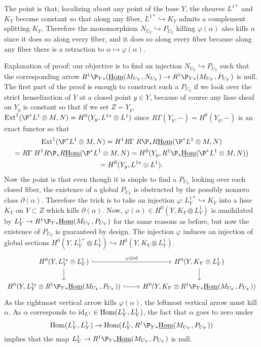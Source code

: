 \documentclass[deligne.tex]{subfiles}
\begin{document}
The point is that, localizing about any point of the base $Y$, the sheaves
$L^{1*}$ and $K_Y$ become constant so that along any fiber,
$L^{1*}\hookrightarrow K_Y$ admits a complement splitting $K_Y$.
Therefore the monomorphism $N_{U_Y}\hookrightarrow P_{U_Y}$ killing
$\varphi(\alpha)$ also kills $\alpha$ since it does so along every fiber,
and it does so along every fiber because along any fiber there is a 
retraction to $\alpha\mapsto\varphi(\alpha)$.

Explanation of proof: our objective is to find an injection
$N_{U_Y}\hookrightarrow P_{U_Y}$ such that the corresponding arrow
$R^1\P_{Y*}(\underline\Hom(M_{U_Y},N_{U_Y})\ra R^1\P_{Y*}(M_{U_Y},P_{U_Y})$
is null. The first part of the proof is enough to construct such a $P_{U_Y}$
if we look over the strict henselization of $Y$ at a closed point
$y\in Y$, because of course any lisse sheaf on $Y_y$ is constant so that if
we set $Z=Y_y$,
$\Ext^1(\P^*L^1\otimes M,N)=H^0(Y_y,L^{1*}\otimes L^1)$
since $R\Gamma(Y_y,-)=H^0(Y_y,-)$ is an exact functor so that
\begin{multline*}
	\Ext^1(\P^*L^1\otimes M,N)
	=H^1R\Gamma\; R\P_*R\underline\Hom(\P^*L^1\otimes M,N) \\
	=R\Gamma\;H^1R\P_*R\underline\Hom(\P^*L^1\otimes M,N)
	=H^0(Y_y,R^1\P_*\underline\Hom(\P^*L^1\otimes M,N)) \\
	=H^0(Y_y,L^{1*}\otimes L^1).
\end{multline*}
Now the point is that even though it is simple to find a $P_{U_Y}$ looking
over each closed fiber, the existence of a global $P_{U_Y}$ is 
obstructed by the possibly nonzero class
$\partial(\alpha)$. Therefore the trick is to take an injection
$\varphi:L^{1*}_Y\hookrightarrow K_Y$ into a lisse $K_Y$ on $Y\subset Z$
which kills $\partial(\alpha)$.
Now, $\varphi(\alpha)\in H^0(Y,K_Y\otimes L^1_Y)$ is annihilated by
$L^1_Y\ra R^1\P_{Y*}\underline\Hom(M_{U_Y},P_{U_Y})$ for the same reasons as
before, but now the existence of $P_{U_Y}$ is guaranteed by design. The
injection $\varphi$ induces an injection of global sections
$H^0(Y,L^{1*}_Y\otimes L^1_Y)\hookrightarrow H^0(Y,K_Y\otimes L^1_Y)$.
\begin{equation*}\begin{tikzcd}
	H^0(Y,L^{1*}_Y\otimes L^1_Y)\arrow[r,"\varphi\otimes\id",hook]\arrow[d]
	& H^0(Y,K_Y\otimes L^1_Y)\arrow[d] \\
	H^0(Y,L^{1*}_Y\otimes R^1\P_{Y*}\underline\Hom(M_{U_Y},P_{U_Y}))
	\arrow[r,hook]
	& H^0(Y,K_Y\otimes R^1\P_{Y*}\underline\Hom(M_{U_Y},P_{U_Y}))
\end{tikzcd}\end{equation*}
As the rightmost vertical arrow kills $\varphi(\alpha)$, the leftmost
vertical arrow must kill $\alpha$. As $\alpha$ corresponds to
$\operatorname{id}_{L^1}\in\operatorname{Hom}(L^1_Y,L^1_Y)$, the fact that $\alpha$ goes to zero under
\begin{equation*}
	\Hom(L^1_Y,L^1_Y)\ra\Hom(L^1_Y,R^1\P_{Y*}\underline\Hom(M_{U_Y},P_{U_Y}))
\end{equation*}
implies that the map $L^1_Y\ra R^1\P_{Y*}\underline\Hom(M_{U_Y},P_{U_Y})$
is null.
\end{document}
